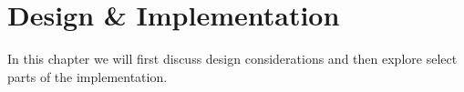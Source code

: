 \chapter{Design \& Implementation}

In this chapter we will first discuss design considerations and then explore select parts of the implementation.